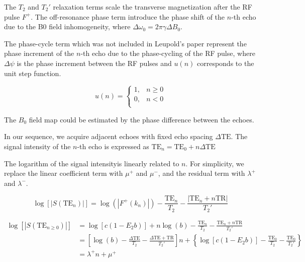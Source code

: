 \documentclass[AMA,STIX2COL,Linenumberson]{MRM}
\begin{document}
The $T_2$ and $T_2'$ relaxation terms scale the transverse magnetization after the RF pulse $F^+$. The off-resonance phase term introduce the phase shift of the $n$-th echo due to the B0 field inhomogeneity, where $\Delta\omega_0 = 2\pi\gamma \Delta B_0$.

The phase-cycle term which was not included in Leupold's paper represent the phase increment of the $n$-th echo due to the phase-cycling of the RF pulse, where $\Delta\psi$ is the phase increment between the RF pulses and $u(n)$ corresponds to the unit step function. 

\begin{equation}
  u(n) = \begin{cases}
    1, & n\ge 0\\
    0, & n<0\\
  \end{cases}
\end{equation}

The $B_0$ field map could be estimated by the phase difference between the echoes.

In our sequence, we acquire adjacent echoes with fixed echo spacing $\Delta\text{TE}$. The signal intensity of the $n$-th echo is expressed as $\text{TE}_n = \text{TE}_0+n\Delta\text{TE}$


The logarithm of the signal intensityis linearly related to $n$. For simplicity, we replace the linear coefficient term with $\mu^+$ and $\mu^-$, and the residual term with $\lambda^+$ and $\lambda^-$.

\begin{equation}
  \log\left[|S(\text{TE}_n)|\right] = \log(|F^+(k_n)|) - \frac{\text{TE}_n}{T_2} - \frac{\left|\text{TE}_n+n\text{TR}\right|}{T_2'}
\end{equation}

\begin{equation}
  \begin{aligned}
    \log\left[|S(\text{TE}_{n\ge 0})|\right] &= \log\left[c(1-E_2b)\right] + n\log(b) - \frac{\text{TE}_n}{T_2} - \frac{\text{TE}_n+n\text{TR}}{T_2'} \\
    &= \left[\log(b) - \frac{\Delta\text{TE}}{T_2} - \frac{\Delta \text{TE}+\text{TR}}{T_2'} \right]n + \left\{\log\left[c(1-E_2b)\right] - \frac{\text{TE}_0}{T_2} - \frac{\text{TE}_0}{T_2'}\right\} \\
    &= \lambda^+ n + \mu^+\\
  \end{aligned}
\end{equation}
\end{document}
